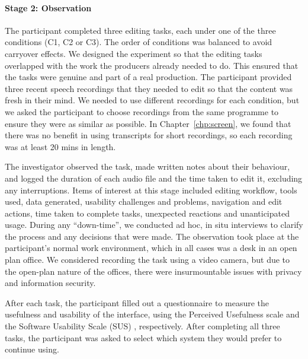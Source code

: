 \paragraph{Stage 2: Observation}

The participant completed three editing tasks, each under one of the three conditions (C1, C2 or C3).  The order of
conditions was balanced to avoid carryover effects.  We designed the experiment so that the editing tasks
overlapped with the work the producers already needed to do. This ensured that the tasks were genuine and part of a
real production.  The participant provided three recent speech recordings that they needed to edit so that the content
was fresh in their mind.  We needed to use different recordings for each condition, but we asked the participant to
choose recordings from the same programme to ensure they were as similar as possible.  In Chapter~\ref{chp:screen}, we
found that there was no benefit in using transcripts for short recordings, so each recording was at least 20 mins in
length. 
 
The investigator observed the task, made written notes about their behaviour, and logged the duration of each audio
file and the time taken to edit it, excluding any interruptions.  Items of interest at this stage included editing
workflow, tools used, data generated, usability challenges and problems, navigation and edit actions, time taken to
complete tasks, unexpected reactions and unanticipated usage. During any ``down-time'', we conducted ad hoc, in situ
interviews to clarify the process and any decisions that were made.  The observation took place at the participant's
normal work environment, which in all cases was a desk in an open plan office.  We considered recording the task using
a video camera, but due to the open-plan nature of the offices, there were insurmountable issues with privacy and
information security.

After each task, the participant filled out a questionnaire to measure the usefulness and usability of the interface,
using the Perceived Usefulness scale \citep{Davis1989} and the Software Usability Scale (SUS) \citep{Brooke1996},
respectively.  After completing all three tasks, the participant was asked to select which system they would prefer to
continue using.


